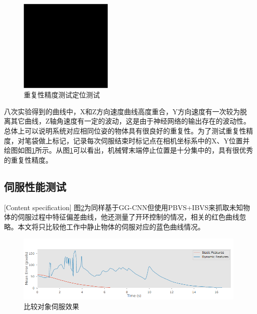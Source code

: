 \documentclass[fontset=fandol,type=bachelor,campus=harbin,bsmainpagenumberline=true]{hithesisbook}
\begin{document}
\begin{figure}[h]
	\centering
	\includegraphics[width=0.4\textwidth]{chapter6/替身}
	\caption{重复性精度测试定位测试}
	\label{重复性精度测试定位测试}
\end{figure}


八次实验得到的曲线中，X和Z方向速度曲线高度重合，Y方向速度有一次较为脱离其它曲线，Z轴角速度有一定的波动，这是由于神经网络的输出存在的波动性。总体上可以说明系统对应相同位姿的物体具有很良好的重复性。为了测试重复性精度，对笔袋做上标记，记录每次伺服结束时标记点在相机坐标系中的X、Y位置并绘图如图\ref{重复性精度测试定位测试}所示。从图\ref{重复性精度测试定位测试}可以看出，机械臂末端停止位置是十分集中的，具有很优秀的重复性精度。
\subsection{伺服性能测试}[Content specification]
图\ref{比较对象伺服效果}为同样基于GG-CNN但使用PBVS+IBVS来抓取未知物体的伺服过程中特征偏差曲线，他还测量了开环控制的情况，相关的红色曲线忽略。本文将只比较他工作中静止物体的伺服对应的蓝色曲线情况。
\begin{figure}[h]
	\centering
	\includegraphics[width=1.0\textwidth]{chapter6/对比工作伺服效果}
	\caption{比较对象伺服效果}
	\label{比较对象伺服效果}
\end{figure}
\end{document}
